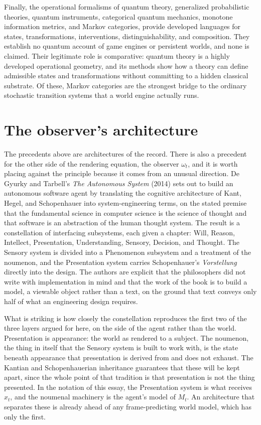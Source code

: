 \documentclass[11pt]{article}
\begin{document}
Finally, the operational formalisms of quantum theory, generalized probabilistic theories, quantum instruments, categorical quantum mechanics, monotone information metrics, and Markov categories, provide developed languages for states, transformations, interventions, distinguishability, and composition. They establish no quantum account of game engines or persistent worlds, and none is claimed. Their legitimate role is comparative: quantum theory is a highly developed operational geometry, and its methods show how a theory can define admissible states and transformations without committing to a hidden classical substrate. Of these, Markov categories are the strongest bridge to the ordinary stochastic transition systems that a world engine actually runs.

\section{The observer's architecture}

The precedents above are architectures of the record. There is also a precedent for the other side of the rendering equation, the observer $\omega_t$, and it is worth placing against the principle because it comes from an unusual direction. De Gyurky and Tarbell's \emph{The Autonomous System} (2014) sets out to build an autonomous software agent by translating the cognitive architecture of Kant, Hegel, and Schopenhauer into system-engineering terms, on the stated premise that the fundamental science in computer science is the science of thought and that software is an abstraction of the human thought system. The result is a constellation of interfacing subsystems, each given a chapter: Will, Reason, Intellect, Presentation, Understanding, Sensory, Decision, and Thought. The Sensory system is divided into a Phenomenon subsystem and a treatment of the noumenon, and the Presentation system carries Schopenhauer's \emph{Vorstellung} directly into the design. The authors are explicit that the philosophers did not write with implementation in mind and that the work of the book is to build a model, a viewable object rather than a text, on the ground that text conveys only half of what an engineering design requires.

What is striking is how closely the constellation reproduces the first two of the three layers argued for here, on the side of the agent rather than the world. Presentation is appearance: the world as rendered to a subject. The noumenon, the thing in itself that the Sensory system is built to work with, is the state beneath appearance that presentation is derived from and does not exhaust. The Kantian and Schopenhauerian inheritance guarantees that these will be kept apart, since the whole point of that tradition is that presentation is not the thing presented. In the notation of this essay, the Presentation system is what receives $x_t$, and the noumenal machinery is the agent's model of $M_t$. An architecture that separates these is already ahead of any frame-predicting world model, which has only the first.
\end{document}
